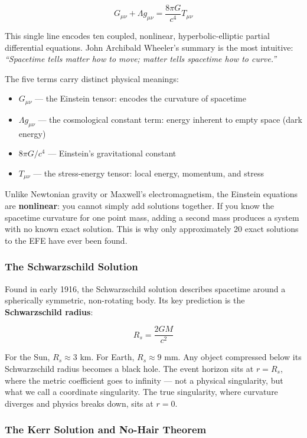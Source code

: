 \documentclass[11pt,letterpaper]{article}
\begin{document}
\[ G_{\mu\nu} + \Lambda g_{\mu\nu} = \frac{8\pi G}{c^4} T_{\mu\nu} \]

This single line encodes ten coupled, nonlinear, hyperbolic-elliptic partial differential equations. John Archibald Wheeler's summary is the most intuitive: \textit{``Spacetime tells matter how to move; matter tells spacetime how to curve.''}

The five terms carry distinct physical meanings:
\begin{itemize}[noitemsep]
\item $G_{\mu\nu}$ --- the Einstein tensor: encodes the curvature of spacetime
\item $\Lambda g_{\mu\nu}$ --- the cosmological constant term: energy inherent to empty space (dark energy)
\item $8\pi G/c^4$ --- Einstein's gravitational constant
\item $T_{\mu\nu}$ --- the stress-energy tensor: local energy, momentum, and stress
\end{itemize}

Unlike Newtonian gravity or Maxwell's electromagnetism, the Einstein equations are \textbf{nonlinear}: you cannot simply add solutions together. If you know the spacetime curvature for one point mass, adding a second mass produces a system with no known exact solution. This is why only approximately 20 exact solutions to the EFE have ever been found.

\subsubsection{The Schwarzschild Solution}

Found in early 1916, the Schwarzschild solution describes spacetime around a spherically symmetric, non-rotating body. Its key prediction is the \textbf{Schwarzschild radius}:

\[ R_s = \frac{2GM}{c^2} \]

For the Sun, $R_s \approx 3$ km. For Earth, $R_s \approx 9$ mm. Any object compressed below its Schwarzschild radius becomes a black hole. The event horizon sits at $r = R_s$, where the metric coefficient goes to infinity --- not a physical singularity, but what we call a coordinate singularity. The true singularity, where curvature diverges and physics breaks down, sits at $r = 0$.

\subsubsection{The Kerr Solution and No-Hair Theorem}
\end{document}
